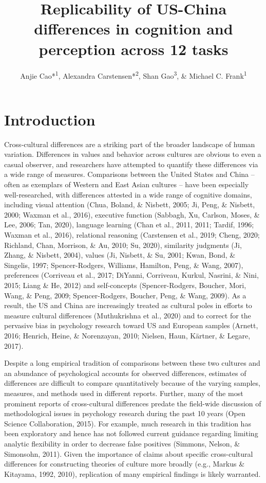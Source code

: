 \documentclass[
  man,floatsintext]{apa6}
\title{Replicability of US-China differences in cognition and perception across 12 tasks}
\author{Anjie Cao*\textsuperscript{1}, Alexandra Carstensen*\textsuperscript{2}, Shan Gao\textsuperscript{3}, \& Michael C. Frank\textsuperscript{1}}
\date{}
\affiliation{\vspace{0.5cm}\textsuperscript{1} Department of Psychology, Stanford University\\\textsuperscript{2} Department of Psychology, University of California, San Diego\\\textsuperscript{3} University of Chicago}
\begin{document}
\maketitle

\hypertarget{introduction}{%
\section{Introduction}\label{introduction}}

Cross-cultural differences are a striking part of the broader landscape of human variation. Differences in values and behavior across cultures are obvious to even a casual observer, and researchers have attempted to quantify these differences via a wide range of measures. Comparisons between the United States and China -- often as exemplars of Western and East Asian cultures -- have been especially well-researched, with differences attested in a wide range of cognitive domains, including visual attention (Chua, Boland, \& Nisbett, 2005; Ji, Peng, \& Nisbett, 2000; Waxman et al., 2016), executive function (Sabbagh, Xu, Carlson, Moses, \& Lee, 2006; Tan, 2020), language learning (Chan et al., 2011, 2011; Tardif, 1996; Waxman et al., 2016), relational reasoning (Carstensen et al., 2019; Cheng, 2020; Richland, Chan, Morrison, \& Au, 2010; Su, 2020), similarity judgments (Ji, Zhang, \& Nisbett, 2004), values (Ji, Nisbett, \& Su, 2001; Kwan, Bond, \& Singelis, 1997; Spencer-Rodgers, Williams, Hamilton, Peng, \& Wang, 2007), preferences (Corriveau et al., 2017; DiYanni, Corriveau, Kurkul, Nasrini, \& Nini, 2015; Liang \& He, 2012) and self-concepts (Spencer-Rodgers, Boucher, Mori, Wang, \& Peng, 2009; Spencer-Rodgers, Boucher, Peng, \& Wang, 2009). As a result, the US and China are increasingly treated as cultural poles in efforts to measure cultural differences (Muthukrishna et al., 2020) and to correct for the pervasive bias in psychology research toward US and European samples (Arnett, 2016; Henrich, Heine, \& Norenzayan, 2010; Nielsen, Haun, Kärtner, \& Legare, 2017).

Despite a long empirical tradition of comparisons between these two cultures and an abundance of psychological accounts for observed differences, estimates of differences are difficult to compare quantitatively because of the varying samples, measures, and methods used in different reports. Further, many of the most prominent reports of cross-cultural differences predate the field-wide discussion of methodological issues in psychology research during the past 10 years (Open Science Collaboration, 2015). For example, much research in this tradition has been exploratory and hence has not followed current guidance regarding limiting analytic flexibility in order to decrease false positives (Simmons, Nelson, \& Simonsohn, 2011). Given the importance of claims about specific cross-cultural differences for constructing theories of culture more broadly (e.g., Markus \& Kitayama, 1992, 2010), replication of many empirical findings is likely warranted.
\end{document}
